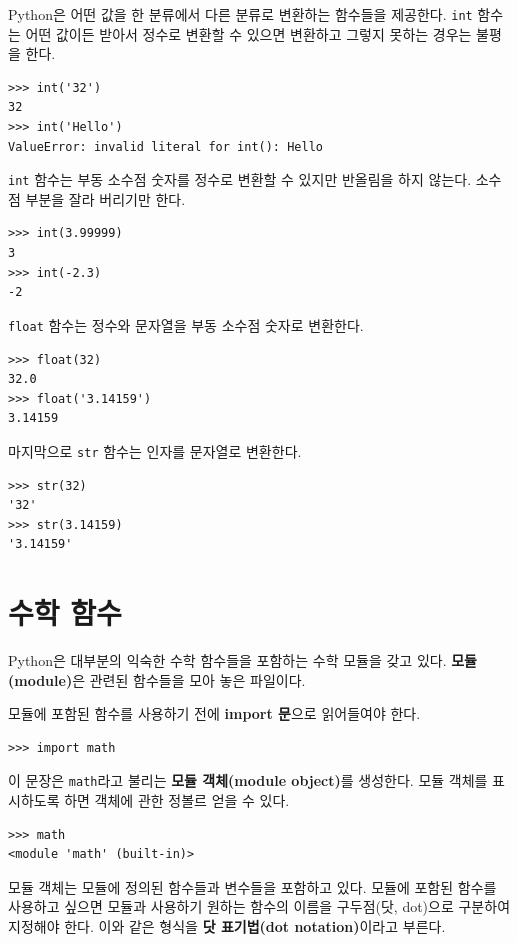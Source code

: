 \documentclass[10pt]{book}
\begin{document}
Python은 어떤 값을 한 분류에서 다른 분류로 변환하는 함수들을 제공한다.
{\tt int} 함수는 어떤 값이든 받아서 정수로 변환할 수 있으면 변환하고
그렇지 못하는 경우는 불평을 한다.

\begin{verbatim}
>>> int('32')
32
>>> int('Hello')
ValueError: invalid literal for int(): Hello
\end{verbatim}
%
{\tt int} 함수는 부동 소수점 숫자를 정수로 변환할 수 있지만 반올림을 하지
않는다.  소수점 부분을 잘라 버리기만 한다.

\begin{verbatim}
>>> int(3.99999)
3
>>> int(-2.3)
-2
\end{verbatim}
%
{\tt float} 함수는 정수와 문자열을 부동 소수점 숫자로 변환한다. 

\begin{verbatim}
>>> float(32)
32.0
>>> float('3.14159')
3.14159
\end{verbatim}
%
마지막으로 {\tt str} 함수는 인자를 문자열로 변환한다. 

\begin{verbatim}
>>> str(32)
'32'
>>> str(3.14159)
'3.14159'
\end{verbatim}
%

\section{수학 함수}

Python은 대부분의 익숙한 수학 함수들을 포함하는 수학 모듈을 갖고 있다.
{\bf 모듈(module)}은 관련된 함수들을 모아 놓은 파일이다.

모듈에 포함된 함수를 사용하기 전에 {\bf import 문}으로 읽어들여야 한다. 

\begin{verbatim}
>>> import math
\end{verbatim}
%
이 문장은 \texttt{math}라고 불리는 {\bf 모듈 객체(module object)}를
생성한다.  모듈 객체를 표시하도록 하면 객체에 관한 정볼르 얻을 수
있다.


\begin{verbatim}
>>> math
<module 'math' (built-in)>
\end{verbatim}
%
모듈 객체는 모듈에 정의된 함수들과 변수들을 포함하고 있다.  모듈에
포함된 함수를 사용하고 싶으면 모듈과 사용하기 원하는 함수의 이름을
구두점(닷, dot)으로 구분하여 지정해야 한다.  이와 같은 형식을 {\bf 닷
  표기법(dot notation)}이라고 부른다.
\end{document}
